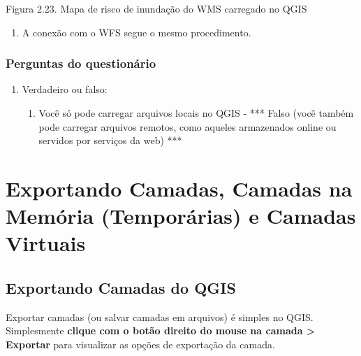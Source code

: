 \documentclass[
  portuguese,
]{krantz}
\providecommand{\tightlist}{%
  \setlength{\itemsep}{0pt}\setlength{\parskip}{0pt}}
\begin{document}
Figura 2.23. Mapa de risco de inundação do WMS carregado no QGIS

\begin{enumerate}
\def\labelenumi{\arabic{enumi}.}
\setcounter{enumi}{6}
\tightlist
\item
  A conexão com o WFS segue o mesmo procedimento.
\end{enumerate}

\hypertarget{perguntas-do-questionuxe1rio-5}{%
\subsubsection{\texorpdfstring{\textbf{Perguntas do questionário}}{Perguntas do questionário}}\label{perguntas-do-questionuxe1rio-5}}

\begin{enumerate}
\def\labelenumi{\arabic{enumi}.}
\item
  Verdadeiro ou falso:

  \begin{enumerate}
  \def\labelenumii{\arabic{enumii}.}
  \tightlist
  \item
    Você só pode carregar arquivos locais no QGIS - *** Falso (você também pode carregar arquivos remotos, como aqueles armazenados online ou servidos por serviços da web) ***
  \end{enumerate}
\end{enumerate}

\hypertarget{exportando-camadas-camadas-na-memuxf3ria-temporuxe1rias-e-camadas-virtuais}{%
\section{Exportando Camadas, Camadas na Memória (Temporárias) e Camadas Virtuais}\label{exportando-camadas-camadas-na-memuxf3ria-temporuxe1rias-e-camadas-virtuais}}

\hypertarget{exportando-camadas-do-qgis}{%
\subsection{\texorpdfstring{\textbf{Exportando Camadas do QGIS}}{Exportando Camadas do QGIS}}\label{exportando-camadas-do-qgis}}

Exportar camadas (ou salvar camadas em arquivos) é simples no QGIS. Simplesmente \textbf{clique com o botão direito do mouse na camada \textgreater{} Exportar} para visualizar as opções de exportação da camada.
\end{document}
